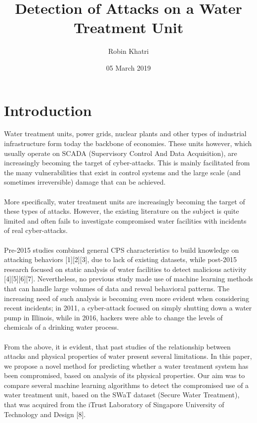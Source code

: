 \documentclass{article}
\title{Detection of Attacks on a Water Treatment Unit}
\author{Robin Khatri}
\date{05 March 2019}
\begin{document}
\maketitle

\section{Introduction}
Water treatment units, power grids, nuclear plants and other types of industrial infrastructure form today the backbone of economies. These units however, which usually operate on SCADA (Supervisory Control And Data Acquisition), are increasingly becoming the target of cyber-attacks. This is mainly facilitated from the many vulnerabilities that exist in control systems and the large scale (and sometimes irreversible) damage that can be achieved.  
\\
\\
More specifically, water treatment units are increasingly becoming the target of these types of attacks. However, the existing literature on the subject is quite limited and often fails to investigate compromised water facilities with incidents of real cyber-attacks. 
\\
\\
Pre-2015 studies combined general CPS characteristics to build knowledge on attacking behaviors [1][2][3], due to lack of existing datasets, while post-2015 research focused on static analysis of water facilities to detect malicious activity [4][5][6][7]. Nevertheless, no previous study made use of machine learning methods that can handle large volumes of data and reveal behavioral patterns. The increasing need of such analysis is becoming even more evident when considering recent incidents; in 2011, a cyber-attack focused on simply shutting down a water pump in Illinois, while in 2016, hackers were able to change the levels of chemicals of a drinking water process. 
\\
\\
From the above, it is evident, that past studies of the relationship between attacks and physical properties of water present several limitations. In this paper, we propose a novel method for predicting whether a water treatment system has been compromised, based on analysis of its physical properties. Our aim was to compare several machine learning algorithms to detect the compromised use of a water treatment unit, based on the SWaT dataset (Secure Water Treatment), that was acquired from the iTrust Laboratory of Singapore University of Technology and Design [8].  
\\
\\
\end{document}
